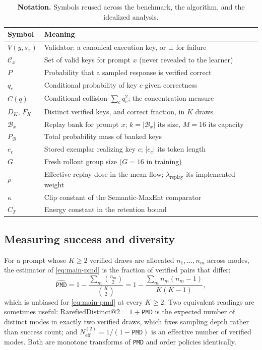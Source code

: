\documentclass{article}
\newcommand{\1}{\mathbf 1}
\newcommand{\pmd}{\texttt{PMD}}
\newcommand{\neff}{\ensuremath{N^{(2)}_{\mathrm{eff}}}}
\theoremstyle{remark}
\theoremstyle{definition}
\theoremstyle{plain}
\begin{document}
\begin{table}[H]
\centering
\caption{\textbf{Notation.} Symbols reused across the benchmark, the
algorithm, and the idealized analysis.}
\label{tab:notation}
\small
\setlength{\tabcolsep}{5pt}
\begin{tabularx}{\linewidth}{@{}lX@{}}
\toprule
\textbf{Symbol} & \textbf{Meaning} \\
\midrule
$V(y,s_x)$ & Validator: a canonical execution key, or $\bot$ for failure \\
$\mathcal C_x$ & Set of valid keys for prompt $x$ (never revealed to the learner) \\
$P$ & Probability that a sampled response is verified correct \\
$q_c$ & Conditional probability of key $c$ given correctness \\
$C(q)$ & Conditional collision $\sum_c q_c^2$; the concentration measure \\
$D_K$, $F_K$ & Distinct verified keys, and correct fraction, in $K$ draws \\
$\mathcal B_x$ & Replay bank for prompt $x$; $k=|\mathcal B_x|$ its size, $M=16$ its capacity \\
$P_{\mathcal B}$ & Total probability mass of banked keys \\
$e_c$ & Stored exemplar realizing key $c$; $|e_c|$ its token length \\
$G$ & Fresh rollout group size ($G=16$ in training) \\
$\rho$ & Effective replay dose in the mean flow; $\lambda_{\mathrm{replay}}$ its implemented weight \\
$\kappa$ & Clip constant of the Semantic-MaxEnt comparator \\
$C_T$ & Energy constant in the retention bound \\
\bottomrule
\end{tabularx}
\end{table}

\subsection{Measuring success and diversity}
\label{app:metric-sampling}

For a prompt whose $K\ge2$ verified draws are allocated $n_1,\dots,n_m$ across
modes, the estimator of \eqref{eq:main-pmd} is the fraction of verified pairs
that differ:
\begin{equation}
 \widehat{\pmd}
 =1-\frac{\sum_m \binom{n_m}{2}}{\binom{K}{2}}
 =1-\frac{\sum_m n_m(n_m-1)}{K(K-1)},
 \label{eq:main-pmd-estimator}
\end{equation}
which is unbiased for \eqref{eq:main-pmd} at every $K\ge2$. Two equivalent
readings are sometimes useful: $\mathrm{RarefiedDistinct@}2=1+\pmd$ is the
expected number of distinct modes in exactly two verified draws, which fixes
sampling depth rather than success count; and $\neff=1/(1-\pmd)$ is an
effective number of verified modes. Both are monotone transforms of \pmd{} and
order policies identically.
\end{document}
